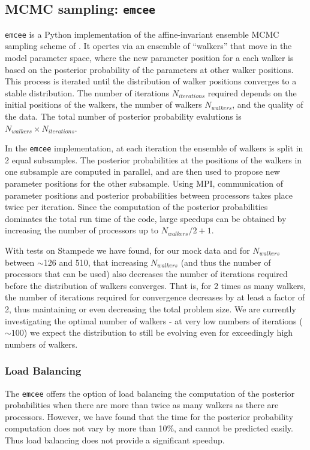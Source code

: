 \documentclass{article}
\begin{document}
\subsection{MCMC sampling: \texttt{emcee}}
\label{sec:emcee}
\texttt{emcee} is a Python implementation of the affine-invariant ensemble MCMC sampling scheme of \cite{goodman_weare}.  It opertes via an ensemble of ``walkers'' that move in the model parameter space, where the new parameter position for a each walker is based on the posterior probability of the parameters at other walker positions.   This process is iterated until the distribution of walker positions converges to a stable distribution. The number of iterations $N_{iterations}$ required depends on the initial positions of the walkers, the number of walkers $N_{walkers}$, and the quality of the data.  The total number of posterior probability evalutions is $N_{walkers} \times N_{iterations}$.

In the \texttt{emcee} implementation, at each iteration the ensemble of walkers is split in 2 equal subsamples. The posterior probabilities at the positions of the walkers in one subsample are computed in parallel, and are then used to propose new parameter positions for the other subsample. Using MPI, communication of parameter positions and posterior probabilities between processors takes place twice per iteration. Since the computation of the posterior probabilities dominates the total run time of the code, large speedups can be obtained by increasing the number of processors up to $N_{walkers}/2 + 1$.  

With tests on Stampede we have found, for our mock data and for $N_{walkers}$ between $\sim$126 and 510, that increasing $N_{walkers}$ (and thus the number of processors that can be used) also decreases the number of iterations required before the distribution of walkers converges.  That is, for 2 times as many walkers, the number of iterations required for convergence decreases by at least a factor of 2, thus maintaining or even decreasing the total problem size.  We are currently investigating the optimal number of walkers - at very low numbers of iterations ($\sim 100$) we expect the distribution to still be evolving even for exceedingly high numbers of walkers.

\subsubsection{Load Balancing}
The \texttt{emcee} offers the option of load balancing the computation of the posterior probabilities when there are more than twice as many walkers as there are processors.  However, we have found that the time for the posterior probability computation does not vary by more than 10\%, and cannot be predicted easily. Thus load balancing does not provide a significant speedup. 
\end{document}
